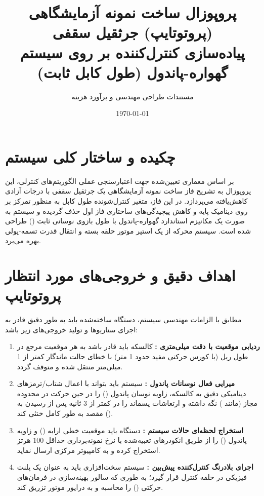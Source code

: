 \documentclass[11pt,a4paper]{article}
\title{\textbf{پروپوزال ساخت نمونه آزمایشگاهی (پروتوتایپ) جرثقیل سقفی}\\ \large پیاده‌سازی کنترل‌کننده \lr{NMPC} بر روی سیستم گهواره-پاندول (طول کابل ثابت)}
\author{مستندات طراحی مهندسی و برآورد هزینه}
\date{\today}
\begin{document}
\maketitle

\section{چکیده و ساختار کلی سیستم}
بر اساس معماری تعیین‌شده جهت اعتبارسنجی عملی الگوریتم‌های کنترلی، این پروپوزال به تشریح فاز ساخت نمونه آزمایشگاهی  یک جرثقیل سقفی با درجات آزادی کاهش‌یافته می‌پردازد. در این فاز، متغیر کنترل‌شونده طول کابل  به منظور تمرکز بر روی دینامیک پایه و کاهش پیچیدگی‌های ساختاری فاز اول حذف گردیده و سیستم به صورت یک مکانیزم استاندارد گهواره-پاندول  با طول بازوی نوسانی ثابت () طراحی شده است. سیستم محرکه از یک استپر موتور حلقه بسته و انتقال قدرت تسمه-پولی بهره می‌برد.

\section{اهداف دقیق و خروجی‌های مورد انتظار پروتوتایپ}
مطابق با الزامات مهندسی سیستم، دستگاه ساخته‌شده باید به طور دقیق قادر به اجرای سناریوها و تولید خروجی‌های زیر باشد:

\begin{enumerate}
    \item \textbf{ردیابی موقعیت با دقت میلی‌متری :} کالسکه باید قادر باشد به هر موقعیت مرجع  در طول ریل (با کورس حرکتی مفید حدود 1 متر) با خطای حالت ماندگار کمتر از 1 میلی‌متر منتقل شده و متوقف گردد.
    \item \textbf{میرایی فعال نوسانات پاندول :} سیستم باید بتواند با اعمال شتاب/ترمزهای دینامیکی دقیق به کالسکه، زاویه نوسان پاندول (\lr{$\theta$}) را در حین حرکت در محدوده مجاز (مانند ) نگه داشته و ارتعاشات پسماند را در کمتر از 3 ثانیه پس از رسیدن به مقصد به طور کامل خنثی کند ().
    \item \textbf{استخراج لحظه‌ای حالات سیستم :} دستگاه باید موقعیت خطی ارابه () و زاویه پاندول (\lr{$\theta$}) را از طریق انکودرهای تعبیه‌شده با نرخ نمونه‌برداری حداقل 100 هرتز استخراج کرده و به کامپیوتر مرکزی ارسال نماید.
    \item \textbf{اجرای بلادرنگ کنترل‌کننده پیش‌بین :} سیستم سخت‌افزاری باید به عنوان یک پلنت فیزیکی در حلقه کنترل قرار گیرد؛ به طوری که سالور بهینه‌سازی در  فرمان‌های حرکتی () را محاسبه و به درایور موتور تزریق کند.
\end{enumerate}
\end{document}
